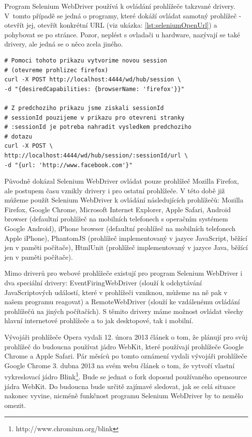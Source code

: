 \documentclass[thesis=M,czech]{FITthesis}[2013/05/10]
\begin{document}
Program Selenium WebDriver používá k ovládání prohlížeče takzvané drivery. V~tomto případě se jedná o programy, které dokáží ovládat samotný prohlížeč - otevřít jej, otevřít konkrétní URL (viz ukázka: \ref{lst:seleniumOpenUrl}) a pohybovat se po stránce. Pozor, neplést s ovladači u hardware, nazývají se také drivery, ale jedná se o něco zcela jiného. 

\begin{lstlisting}[caption={Příklad otevření URL v programu Selenium WebDriver pomocí cURL},label=lst:seleniumOpenUrl,belowcaptionskip=0.4cm]
# Pomoci tohoto prikazu vytvorime novou session 
# (otevreme prohlizec firefox)
curl -X POST http://localhost:4444/wd/hub/session \
-d "{desiredCapabilities: {browserName: 'firefox'}}"

# Z predchoziho prikazu jsme ziskali sessionId
# sessionId pouzijeme v prikazu pro otevreni stranky
# :sessionId je potreba nahradit vysledkem predchoziho
# dotazu
curl -X POST \
http://localhost:4444/wd/hub/session/:sessionId/url \
-d "{url: 'http://www.facebook.com'}" 
\end{lstlisting}

Původně dokázal Selenium WebDriver ovládat pouze prohlížeč Mozilla Firefox, ale postupem času vznikly drivery i pro ostatní prohlížeče. V této době již můžeme použít Selenium WebDriver k ovládání následujících prohlížečů: Mozilla Firefox, Google Chrome, Microsoft Internet Explorer, Apple Safari, Android browser (defaultní prohlížeč na mobilních telefonech s operačním systémem Google Android), iPhone browser (defaultní prohlížeč na mobilních telefonech Apple iPhone), PhantomJS (prohlížeč implementovaný v jazyce JavaScript, běžící jen v paměti počítače), HtmlUnit (prohlížeč implementovaný v jazyce Java, běžící jen v paměti počítače). 

Mimo driverů pro webové prohlížeče existují pro program Selenium WebDriver i dva speciální drivery: EventFiringWebDriver (slouží k odchytávání JavaScriptových událostí, které v prohlížeči vzniknou, můžeme na ně pak v našem programu reagovat) a RemoteWebDriver (slouží ke vzdálenému ovládání prohlížečů na jiných počítačích). S těmito drivery máme možnost ovládat všechy hlavní internetové prohlížeče a to jak desktopové, tak i mobilní.

Vývojáři prohlížeče Opera vydali 12. února 2013 
článek \cite{web:operaMovesToWebkit} o tom, že plánují pro svůj prohlížeč do budoucna používat jádro WebKit, které používají prohlížeče Google Chrome a Apple Safari. Pár měsíců po tomto oznámení vydali vývojáři prohlížeče Google Chrome 3. dubna 2013 na svém webu článek \cite{web:chromiumBlink} o tom, že vytvoří vlastní vykreslovací jádro Blink\footnote{http://www.chromium.org/blink}. Bude se jednat o fork doposud používaného opensource jádra WebKit. Do budoucna bude určitě zajímavé sledovat, jak se celá situace nakonec vyvine, nicméně funkčnost programu Selenium WebDriver by to nemělo omezit.
\end{document}
